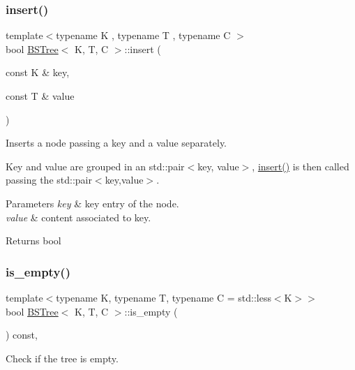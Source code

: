 \subsubsection{\texorpdfstring{insert()}{insert()}\hspace{0.1cm}{\footnotesize\ttfamily [2/2]}}
{\footnotesize\ttfamily template$<$typename K , typename T , typename C $>$ \\
bool \hyperlink{class_b_s_tree}{B\+S\+Tree}$<$ K, T, C $>$\+::insert (\begin{DoxyParamCaption}\item[{const K \&}]{key,  }\item[{const T \&}]{value }\end{DoxyParamCaption})}



Inserts a node passing a key and a value separately. 

Key and value are grouped in an std\+::pair$<$key, value$>$, \hyperlink{class_b_s_tree_a23746c31f7583acad81c9b7f08159003}{insert()} is then called passing the std\+::pair$<$key,value$>$.


\begin{DoxyParams}{Parameters}
{\em key} & key entry of the node. \\
\hline
{\em value} & content associated to key. \\
\hline
\end{DoxyParams}
\begin{DoxyReturn}{Returns}
bool 
\end{DoxyReturn}
\mbox{\label{class_b_s_tree_a8002c1bc948d8ef1085fb53949562fc0}} 
\subsubsection{\texorpdfstring{is\+\_\+empty()}{is\_empty()}}
{\footnotesize\ttfamily template$<$typename K, typename T, typename C = std\+::less$<$\+K$>$$>$ \\
bool \hyperlink{class_b_s_tree}{B\+S\+Tree}$<$ K, T, C $>$\+::is\+\_\+empty (\begin{DoxyParamCaption}{ }\end{DoxyParamCaption}) const\hspace{0.3cm}{\ttfamily [inline]}, {\ttfamily [noexcept]}}



Check if the tree is empty. 


